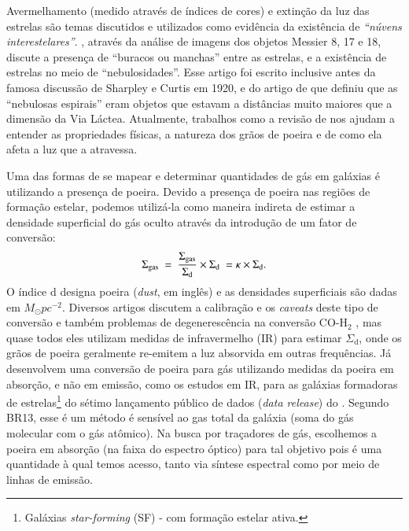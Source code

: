 Avermelhamento (medido através de índices de cores) e extinção da luz das estrelas são temas discutidos e utilizados como evidência da existência de {\em ``núvens interestelares''}. \citet{Barnard.1908a}, através da análise de imagens dos objetos Messier 8, 17 e 18, discute a presença de ``buracos ou manchas'' entre as estrelas, e a existência de estrelas no meio de ``nebulosidades''. Esse artigo foi escrito inclusive antes da famosa discussão de Sharpley e Curtis em 1920, e do artigo de \citet{Hubble.1925a} que definiu que as ``nebulosas espirais'' eram objetos que estavam a distâncias muito maiores que a dimensão da Via Láctea. Atualmente, trabalhos como a revisão de \citet{Draine.2003a} nos ajudam a entender as propriedades físicas, a natureza dos grãos de poeira e de como ela afeta a luz que a atravessa.

Uma das formas de se mapear e determinar quantidades de gás em galáxias é utilizando a presença de poeira. Devido a presença de poeira nas regiões de formação estelar, podemos utilizá-la como maneira indireta de estimar a densidade superficial do gás oculto através da introdução de um fator de conversão:
\begin{equation}
	\label{eq:dust2gas}
	\Sigma_{\mathrm{gas}}\ =\ \frac{\Sigma_{\mathrm{gas}}}{\Sigma_{\mathrm{d}}} \times \Sigma_{\mathrm{d}}\ = \kappa \times \Sigma_{\mathrm{d}}.
\end{equation}
\noindent O índice d designa poeira ({\em dust}, em inglês) e as densidades superficiais são dadas em $M_\odot pc^{-2}$. Diversos artigos discutem a calibração e os {\em caveats} deste tipo de conversão e também problemas de degenerescência na conversão CO-$\mathrm{H}_2$ \citep{Guiderdoni.Rocca.1987, Leroy.etal.2011a, Leroy.etal.2013a, RemyRuyer.etal.2014a}, mas quase todos eles utilizam medidas de infravermelho (IR) para estimar $\Sigma_{\mathrm{d}}$, onde os grãos de poeira geralmente re-emitem a luz absorvida em outras frequências. Já \citet[][BR13 daqui em diante]{Brinchmann.etal.2013a} desenvolvem uma conversão de poeira para gás utilizando medidas da poeira em absorção, e não em emissão, como os estudos em IR, para as galáxias formadoras de estrelas\footnote{Galáxias {\em star-forming} (SF) - com formação estelar ativa.} do sétimo lançamento público de dados ({\em data release}) do \SDSS \citep[][DR7]{Abazajian.etal.2009a}. Segundo BR13, esse é um método é sensível ao gas total da galáxia (soma do gás molecular com o gás atômico). Na busca por traçadores de gás, escolhemos a poeira em absorção (na faixa do espectro óptico) para tal objetivo pois é uma quantidade à qual temos acesso, tanto via síntese espectral como por meio de linhas de emissão.


